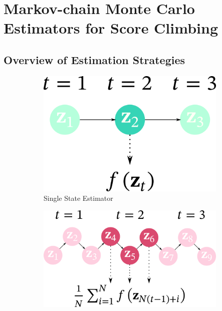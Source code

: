 
\section{Markov-chain Monte Carlo Estimators for Score Climbing}
\vspace{-0.05in}
\subsection{Overview of Estimation Strategies}\label{section:overview}
%
\vspace{-0.05in}

\begin{figure}
    \centering
    \begin{subfigure}[b]{0.25\textwidth}
        \centering
        \includegraphics[scale=0.25]{figures/diagram_1.png}
        \caption{Single State Estimator}\label{fig:single}
    \end{subfigure}
    \begin{subfigure}[b]{0.35\textwidth}
        \centering
        \includegraphics[scale=0.25]{figures/diagram_2.png}

\end{subfigure}
\end{figure}
